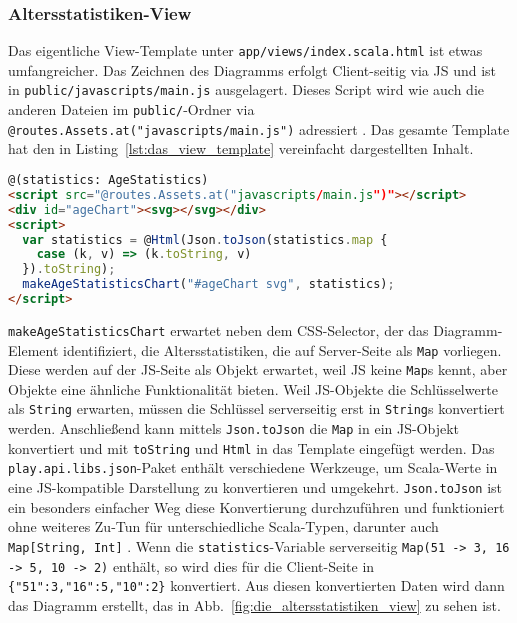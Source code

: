 
\subsubsection{Altersstatistiken-View} %
\label{ssub:altersstatistiken_view}

Das eigentliche View-Template unter \lstinline|app/views/index.scala.html| ist etwas umfangreicher.
Das Zeichnen des Diagramms erfolgt Client-seitig via JS und ist in \lstinline|public/javascripts/main.js| ausgelagert.
Dieses Script wird wie auch die anderen Dateien im \lstinline|public/|-Ordner via \lstinline|@routes.Assets.at("javascripts/main.js")| adressiert \cite[vgl.][S.~136]{play_for_scala_v8}.
Das gesamte Template hat den in Listing~\ref{lst:das_view_template} vereinfacht dargestellten Inhalt.

\begin{lstlisting}[language=html,caption=Das View-Template, label=lst:das_view_template]
@(statistics: AgeStatistics)
<script src="@routes.Assets.at("javascripts/main.js")"></script>
<div id="ageChart"><svg></svg></div>
<script>
  var statistics = @Html(Json.toJson(statistics.map {
    case (k, v) => (k.toString, v)
  }).toString);
  makeAgeStatisticsChart("#ageChart svg", statistics);
</script>
\end{lstlisting}

\lstinline|makeAgeStatisticsChart| erwartet neben dem CSS-Selector, der das Diagramm-Element identifiziert, die Altersstatistiken, die auf Server-Seite als \lstinline|Map| vorliegen.
Diese werden auf der JS-Seite als Objekt erwartet, weil JS keine \lstinline|Map|s kennt, aber Objekte eine ähnliche Funktionalität bieten.
Weil JS-Objekte die Schlüsselwerte als \lstinline|String| erwarten, müssen die Schlüssel serverseitig erst in \lstinline|String|s konvertiert werden.
Anschließend kann mittels \lstinline|Json.toJson| die \lstinline|Map| in ein JS-Objekt konvertiert und mit \lstinline|toString| und \lstinline|Html| in das Template eingefügt werden.
Das \lstinline|play.api.libs.json|-Paket enthält verschiedene Werkzeuge, um Scala-Werte in eine JS-kompatible Darstellung zu konvertieren und umgekehrt.
\lstinline|Json.toJson| ist ein besonders einfacher Weg diese Konvertierung durchzuführen und funktioniert ohne weiteres Zu-Tun für unterschiedliche Scala-Typen, darunter auch \lstinline|Map[String, Int]| \cite[vgl.][S.~266]{play_for_scala_v8}.
Wenn die \lstinline|statistics|-Variable serverseitig \lstinline|Map(51 -> 3, 16 -> 5, 10 -> 2)| enthält, so wird dies für die Client-Seite in \lstinline|{"51":3,"16":5,"10":2}| konvertiert.
Aus diesen konvertierten Daten wird dann das Diagramm erstellt, das in Abb.~\ref{fig:die_altersstatistiken_view} zu sehen ist.

